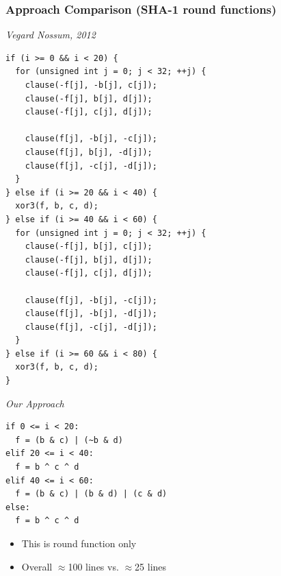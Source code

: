 \documentclass{beamer}
\let\olditem\item
\renewcommand{\item}{%
\olditem\vspace{4pt}}
\begin{document}
\begin{frame}[fragile]
\frametitle{Approach Comparison (SHA-1 round functions)}
\begin{minipage}[t]{.4\textwidth}
\textit{Vegard Nossum, 2012}
{\tiny
\begin{verbatim}
if (i >= 0 && i < 20) {
  for (unsigned int j = 0; j < 32; ++j) {
    clause(-f[j], -b[j], c[j]);
    clause(-f[j], b[j], d[j]);
    clause(-f[j], c[j], d[j]);

    clause(f[j], -b[j], -c[j]);
    clause(f[j], b[j], -d[j]);
    clause(f[j], -c[j], -d[j]);
  }
} else if (i >= 20 && i < 40) {
  xor3(f, b, c, d);
} else if (i >= 40 && i < 60) {
  for (unsigned int j = 0; j < 32; ++j) {
    clause(-f[j], b[j], c[j]);
    clause(-f[j], b[j], d[j]);
    clause(-f[j], c[j], d[j]);

    clause(f[j], -b[j], -c[j]);
    clause(f[j], -b[j], -d[j]);
    clause(f[j], -c[j], -d[j]);
  }
} else if (i >= 60 && i < 80) {
  xor3(f, b, c, d);
}
\end{verbatim}}
\end{minipage}
\hfill
\begin{minipage}[t]{.5\textwidth}
\textit{Our Approach}
{\tiny
\begin{verbatim}
if 0 <= i < 20:
  f = (b & c) | (~b & d)
elif 20 <= i < 40:
  f = b ^ c ^ d
elif 40 <= i < 60:
  f = (b & c) | (b & d) | (c & d)
else:
  f = b ^ c ^ d
\end{verbatim}}
\begin{itemize}
\item This is round function only
\item Overall $\approx$100 lines vs. $\approx$25 lines
\end{itemize}
\end{minipage}
\end{frame}
\end{document}
